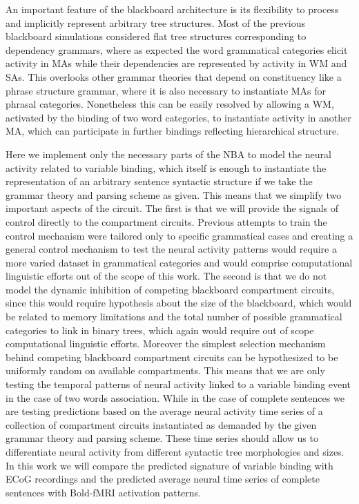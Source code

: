 \documentclass[10pt]{article}
\begin{document}
An important feature of the blackboard architecture is its flexibility
to process and implicitly represent arbitrary tree structures. Most of
the previous blackboard simulations considered flat tree structures
corresponding to dependency grammars\cite{nivre2005dependency}, where
as expected the word grammatical categories elicit activity in MAs
while their dependencies are represented by activity in WM and SAs.
This overlooks other grammar theories that depend on constituency like
a phrase structure grammar\cite{gazdar1982phrase}, where it is also
necessary to instantiate MAs for phrasal categories. Nonetheless this
can be easily resolved by allowing a WM, activated by the binding of
two word categories, to instantiate activity in another MA, which can
participate in further bindings reflecting hierarchical structure.

Here we implement only the necessary parts of the NBA to model the
neural activity related to variable binding, which itself is enough to
instantiate the representation of an arbitrary sentence syntactic
structure if we take the grammar theory and parsing scheme as given.
This means that we simplify two important aspects of the circuit. The
first is that we will provide the signals of control directly to the
compartment circuits. Previous attempts to train the control
mechanism\cite{van_der_Velde_2010} were tailored only to specific
grammatical cases and creating a general control mechanism to test the
neural activity patterns would require a more varied dataset in
grammatical categories and would comprise computational linguistic
efforts out of the scope of this work. The second is that we do not
model the dynamic inhibition of competing blackboard compartment
circuits, since this would require hypothesis about the size of the
blackboard, which would be related to memory limitations and the total
number of possible grammatical categories to link in binary trees,
which again would require out of scope computational linguistic
efforts. Moreover the simplest selection mechanism behind competing
blackboard compartment circuits can be hypothesized to be uniformly
random on available compartments. This means that we are only testing
the temporal patterns of neural activity linked to a variable binding
event in the case of two words association. While in the case of
complete sentences we are testing predictions based on the average
neural activity time series of a collection of compartment circuits
instantiated as demanded by the given grammar theory and parsing
scheme. These time series should allow us to differentiate neural
activity from different syntactic tree morphologies and sizes. In this
work we will compare the predicted signature of variable binding with
ECoG recordings and the predicted average neural time series of
complete sentences with Bold-fMRI activation patterns.
\end{document}
